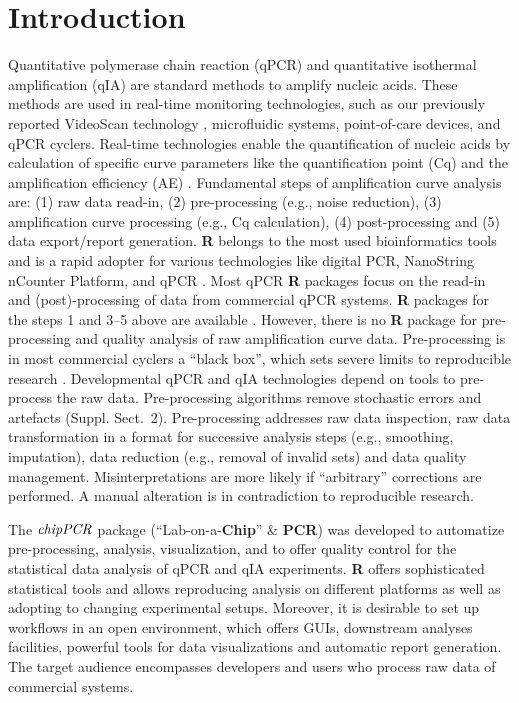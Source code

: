\documentclass{bioinfo}
\begin{document}
\section{Introduction}

Quantitative polymerase chain reaction (qPCR) and quantitative isothermal 
amplification (qIA) are standard methods to amplify nucleic acids. These methods 
are used in real-time monitoring technologies, such as our previously reported 
VideoScan technology \citep{roediger_highly_2013}, microfluidic systems, point-of-care devices, and qPCR 
cyclers. Real-time technologies enable the quantification of nucleic acids by 
calculation of specific curve parameters like the quantification point (Cq) and 
the amplification efficiency (AE) 
\citep{pabinger_2014,rodiger_nucleic_2014}. Fundamental 
steps of amplification curve analysis are: (1) raw data read-in, (2) 
pre-processing (e.g., noise reduction), (3) amplification curve processing 
(e.g., Cq calculation), (4) post-processing and (5) data 
export/report generation. \textbf{R} belongs to the most used bioinformatics	
tools and is a rapid adopter for various technologies like digital PCR, 
NanoString nCounter Platform, and qPCR \citep{waggott_2012,pabinger_2014}. Most 
qPCR \textbf{R} packages focus on the read-in and (post)-processing of data from 
commercial qPCR systems. \textbf{R} packages for the steps 1 and 3--5 above are 
available \citep{perkins_2012,gehlenborg_2013,mccall_2014,pabinger_2014}.
However, there is no \textbf{R} package for pre-processing and quality analysis 
of raw amplification curve data. Pre-processing is in most commercial cyclers a 
``black box'', which sets severe limits to reproducible research 
\citep{Leeper_2014}. Developmental qPCR and qIA technologies depend on tools to 
pre-process the raw data. Pre-processing algorithms remove stochastic errors and 
artefacts (Suppl. Sect.~2). Pre-processing addresses raw data %
inspection, raw data transformation in a format for successive analysis steps 
(e.g., smoothing, imputation), data reduction (e.g., removal of invalid sets) 
and data quality management. Misinterpretations are more likely if ``arbitrary'' 
corrections are performed. A manual alteration is in contradiction to 
reproducible research.

The $\emph{chipPCR}$ package (``Lab-on-a-\textbf{Chip}'' 
\& \textbf{PCR}) was developed to automatize 
pre-processing, analysis, visualization, and to offer quality control for 
the statistical data analysis of qPCR and qIA experiments. \textbf{R} offers 
sophisticated statistical tools and allows reproducing analysis on different 
platforms as well as adopting to changing experimental setups. Moreover, it is 
desirable to set up workflows in an open environment, which offers GUIs, downstream 
analyses facilities, powerful tools for data visualizations and automatic 
report generation. The target audience encompasses developers and users who 
process raw data of commercial systems.
\end{document}
